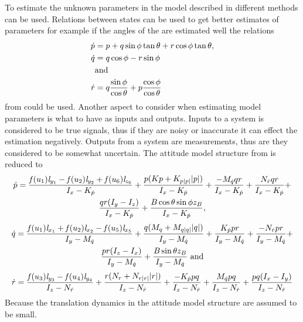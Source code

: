 To estimate the unknown parameters in the \abbrROV model described in  different methods can be used. Relations between states can be used to get better estimates of parameters for example if the angles of the \abbrROV are estimated well the relations
\begin{align}
\dot{p} &= p + q \sin \phi \tan \theta + r \cos \phi \tan \theta,\\
\dot{q} &= q \cos \phi - r \sin \phi \\
&\textrm{and} \nonumber \\
\dot{r} &= q \frac{\sin \phi}{\cos \theta} + p \frac{\cos \phi}{\cos \theta}
\end{align}
from  could be used. Another aspect to consider when estimating model parameters is what to have as inputs and outputs. Inputs to a system is considered to be true signals, thus if they are noisy or inaccurate it can effect the estimation negatively. Outputs from a system are measurements, thus are they considered to be somewhat uncertain. The attitude model structure from  is reduced to 
\begin{multline} \label{eq:p_dotWithoutTranslation}
\dot{p} = \frac{\mathit{f}(u_{1}) \mathit{l}_{y_{1}} - \mathit{f}(u_{2}) \mathit{l}_{y_{2}} + \mathit{f}(u_{6}) \mathit{l}_{z_{6}}}{I_{x} - K_{\dot{p}}} + \frac{p (Kp + K_{p|p|} |p|)}{I_{x} - K_{\dot{p}}} + \frac{-M_{\dot{q}} q r}{I_{x} - K_{\dot{p}}} + \frac{N_{\dot{r}} q r}{I_{x} - K_{\dot{p}}} +\\
\frac{q r (I_{y} - I_{z})}{I_{x} - K_{\dot{p}}} + \frac{B \cos{\theta} \sin{\phi} z_B}{I_{x} - K_{\dot{p}}},
\end{multline} 
\begin{multline} \label{eq:q_dotWithoutTranslation}
\dot{q} =\frac{\mathit{f}(u_{1}) \mathit{l}_{x_{1}} + \mathit{f}(u_{2}) \mathit{l}_{x_{2}} - \mathit{f}(u_{5}) \mathit{l}_{x_{5}}}{I_{y} - M_{\dot{q}}} + \frac{q (M_{q} + M_{q|q|} |q|)}{I_{y} - M_{\dot{q}}} + \frac{K_{\dot{p}} p r}{I_{y} - M_{\dot{q}}} + \frac{-N_{\dot{r}} p r}{I_{y} - M_{\dot{q}}} +\\
\frac{p r (I_{z} - I_{x})}{I_{y} - M_{\dot{q}}} + \frac{B \sin{\theta} z_B}{I_{y} - M_{\dot{q}}}\ \textrm{and}
\end{multline} 
\begin{multline} \label{eq:r_dotWithoutTranslation}
\dot{r} = \frac{\mathit{f}(u_{3}) \mathit{l}_{y_{3}} - \mathit{f}(u_{4}) \mathit{l}_{y_{4}}}{I_{z} - N_{\dot{r}}} + \frac{r (N_{r} + N_{r|r|} |r|)}{I_{z} - N_{\dot{r}}} + \frac{-K_{\dot{p}} p q}{I_{z} - N_{\dot{r}}} + \frac{M_{\dot{q}} p q}{I_{z} - N_{\dot{r}}} + \frac{p q (I_{x} - I_{y})}{I_{z} - N_{\dot{r}}}
\end{multline} 
Because the translation dynamics in the attitude model structure are assumed to be small.

